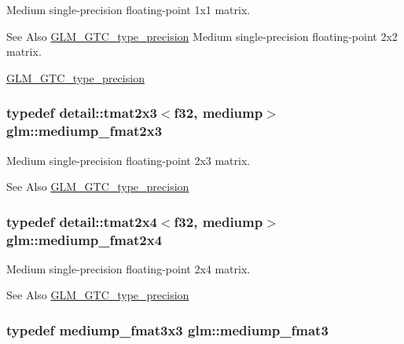 Medium single-\/precision floating-\/point 1x1 matrix. \begin{DoxySeeAlso}{See Also}
\hyperlink{group__gtc__type__precision}{G\-L\-M\-\_\-\-G\-T\-C\-\_\-type\-\_\-precision} Medium single-\/precision floating-\/point 2x2 matrix. 

\hyperlink{group__gtc__type__precision}{G\-L\-M\-\_\-\-G\-T\-C\-\_\-type\-\_\-precision} 
\end{DoxySeeAlso}
\hypertarget{group__gtc__type__precision_gaae7081e19f495e7cdbf727e1550b95a8}{
\subsubsection[{mediump\-\_\-fmat2x3}]{\setlength{\rightskip}{0pt plus 5cm}typedef detail\-::tmat2x3$<$f32, mediump$>$ {\bf glm\-::mediump\-\_\-fmat2x3}}}\label{group__gtc__type__precision_gaae7081e19f495e7cdbf727e1550b95a8}
Medium single-\/precision floating-\/point 2x3 matrix. \begin{DoxySeeAlso}{See Also}
\hyperlink{group__gtc__type__precision}{G\-L\-M\-\_\-\-G\-T\-C\-\_\-type\-\_\-precision} 
\end{DoxySeeAlso}
\hypertarget{group__gtc__type__precision_ga8f793d90a5a6bea23c13ad195fcb5de2}{
\subsubsection[{mediump\-\_\-fmat2x4}]{\setlength{\rightskip}{0pt plus 5cm}typedef detail\-::tmat2x4$<$f32, mediump$>$ {\bf glm\-::mediump\-\_\-fmat2x4}}}\label{group__gtc__type__precision_ga8f793d90a5a6bea23c13ad195fcb5de2}
Medium single-\/precision floating-\/point 2x4 matrix. \begin{DoxySeeAlso}{See Also}
\hyperlink{group__gtc__type__precision}{G\-L\-M\-\_\-\-G\-T\-C\-\_\-type\-\_\-precision} 
\end{DoxySeeAlso}
\hypertarget{group__gtc__type__precision_ga85f2267401434ea8c5463af040f0760c}{
\subsubsection[{mediump\-\_\-fmat3}]{\setlength{\rightskip}{0pt plus 5cm}typedef mediump\-\_\-fmat3x3 {\bf glm\-::mediump\-\_\-fmat3}}}\label{group__gtc__type__precision_ga85f2267401434ea8c5463af040f0760c}
